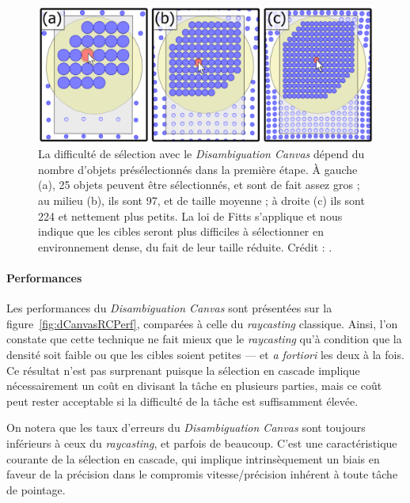 	\begin{figure}[ht]
		\centering
		\includegraphics[width=\textwidth]{figures/ch2/dCanvasDensity}
		\caption[\emph{Disambiguation Canvas} --- Densité]{La difficulté de sélection avec le \emph{Disambiguation Canvas} dépend du nombre d'objets présélectionnés dans la première étape. À gauche (a), 25 objets peuvent être sélectionnés, et sont de fait assez gros ; au milieu (b), ils sont 97, et de taille moyenne ; à droite (c) ils sont 224 et nettement plus petits. La loi de Fitts s'applique et nous indique que les cibles seront plus difficiles à sélectionner en environnement dense, du fait de leur taille réduite. Crédit : \cite{debarba2013disambiguation}.}
		\label{fig:dCanvasDensity}
	\end{figure}
	
	\paragraph{Performances}
	Les performances du \emph{Disambiguation Canvas} sont présentées sur la figure~\ref{fig:dCanvasRCPerf}, comparées à celle du \emph{raycasting} classique. Ainsi, l'on constate que cette technique ne fait mieux que le \emph{raycasting} qu'à condition que la densité soit faible ou que les cibles soient petites --- et \emph{a fortiori} les deux à la fois. Ce résultat n'est pas surprenant puisque la sélection en cascade implique nécessairement un coût en divisant la tâche en plusieurs parties, mais ce coût peut rester acceptable si la difficulté de la tâche est suffisamment élevée.
	
	On notera que les taux d'erreurs du \emph{Disambiguation Canvas} sont toujours inférieurs à ceux du \emph{raycasting}, et parfois de beaucoup. C'est une caractéristique courante de la sélection en cascade, qui implique intrinsèquement un biais en faveur de la précision dans le compromis vitesse/précision inhérent à toute tâche de pointage.
	
